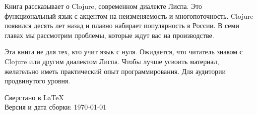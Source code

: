 \thispagestyle{empty}

\small

Книга рассказывает о Clojure, современном диалекте Лиспа. Это функциональный
язык с акцентом на неизменяемость и многопоточность. Clojure появился десять лет
назад и плавно набирает популярность в России. В семи главах мы рассмотрим
проблемы, которые ждут вас на производстве.

Эта книга не для тех, кто учит язык с нуля. Ожидается, что читатель знаком с
Clojure или другим диалектом Лиспа. Чтобы лучше усвоить материал, желательно
иметь практический опыт программирования. Для аудитории продвинутого уровня.

\normalfont

\vspace{5em}

\noindent
Сверстано в \LaTeX\\
Версия и дата сборки: \today
